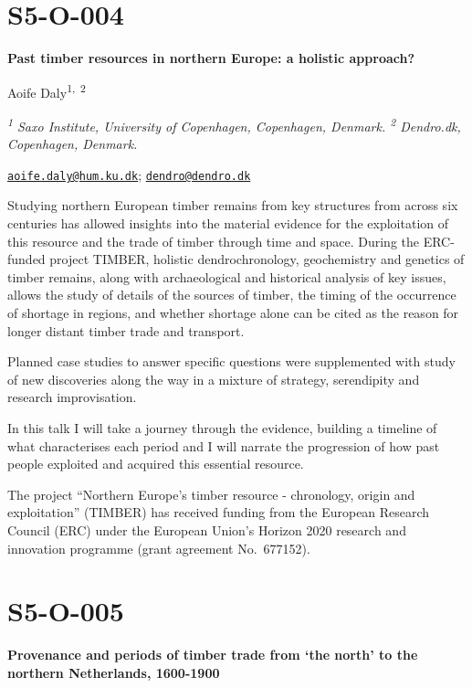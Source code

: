 \documentclass[
]{book}
\begin{document}
\hypertarget{s5-o-004}{%
\section*{S5-O-004}\label{s5-o-004}}

\textbf{Past timber resources in northern Europe: a holistic approach?}

Aoife Daly\textsuperscript{1,~2}

\emph{\textsuperscript{1} Saxo Institute, University of Copenhagen, Copenhagen, Denmark. \textsuperscript{2} Dendro.dk, Copenhagen, Denmark.}

\href{mailto:aoife.daly@hum.ku.dk}{\nolinkurl{aoife.daly@hum.ku.dk}}; \href{mailto:dendro@dendro.dk}{\nolinkurl{dendro@dendro.dk}}

Studying northern European timber remains from key structures from across six centuries has allowed insights into the material evidence for the exploitation of this resource and the trade of timber through time and space. During the ERC-funded project TIMBER, holistic dendrochronology, geochemistry and genetics of timber remains, along with archaeological and historical analysis of key issues, allows the study of details of the sources of timber, the timing of the occurrence of shortage in regions, and whether shortage alone can be cited as the reason for longer distant timber trade and transport.

Planned case studies to answer specific questions were supplemented with study of new discoveries along the way in a mixture of strategy, serendipity and research improvisation.

In this talk I will take a journey through the evidence, building a timeline of what characterises each period and I will narrate the progression of how past people exploited and acquired this essential resource.

The project ``Northern Europe's timber resource - chronology, origin and exploitation'' (TIMBER) has received funding from the European Research Council (ERC) under the European Union's Horizon 2020 research and innovation programme (grant agreement No.~677152).

\hypertarget{s5-o-005}{%
\section*{S5-O-005}\label{s5-o-005}}

\textbf{Provenance and periods of timber trade from `the north' to the northern Netherlands, 1600-1900}
\end{document}
